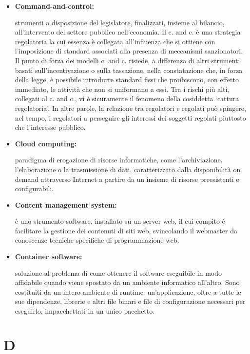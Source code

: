 \begin{itemize}
	\item \hypertarget{cac}{\textbf{Command-and-control:}} strumenti a disposizione del legislatore, finalizzati, insieme al bilancio, all’intervento del settore pubblico nell’economia. Il c. and c. è una strategia regolatoria la cui essenza è collegata all’influenza che si ottiene con l’imposizione di standard associati alla presenza di meccanismi sanzionatori. Il punto di forza dei modelli c. and c. risiede, a differenza di altri strumenti basati sull’incentivazione o sulla tassazione, nella constatazione che, in forza della legge, è possibile introdurre standard fissi che proibiscono, con effetto immediato, le attività che non si uniformano a essi. Tra i rischi più alti, collegati al c. and c., vi è sicuramente il fenomeno della cosiddetta ‘cattura regolatoria’. In altre parole, la relazione tra regolatori e regolati può spingere, nel tempo, i regolatori a perseguire gli interessi dei soggetti regolati piuttosto che l’interesse pubblico.
	
	\item \hypertarget{cc}{\textbf{Cloud computing:}} paradigma di erogazione di risorse informatiche, come l'archiviazione, l'elaborazione o la trasmissione di dati, caratterizzato dalla disponibilità on demand attraverso Internet a partire da un insieme di risorse preesistenti e configurabili.
	
	\item \hypertarget{cms}{\textbf{Content management system:}}  è uno strumento software, installato su un server web, il cui compito è facilitare la gestione dei contenuti di siti web, svincolando il webmaster da conoscenze tecniche specifiche di programmazione web.
	
	\item \hypertarget{cs}{\textbf{Container software:}} soluzione al problema di come ottenere il software eseguibile in modo affidabile quando viene spostato da un ambiente informatico all'altro. Sono costituiti da un intero ambiente di runtime: un'applicazione, oltre a tutte le sue dipendenze, librerie e altri file binari e file di configurazione necessari per eseguirlo, impacchettati in un unico pacchetto.
	 
\end{itemize}

\section*{D}

